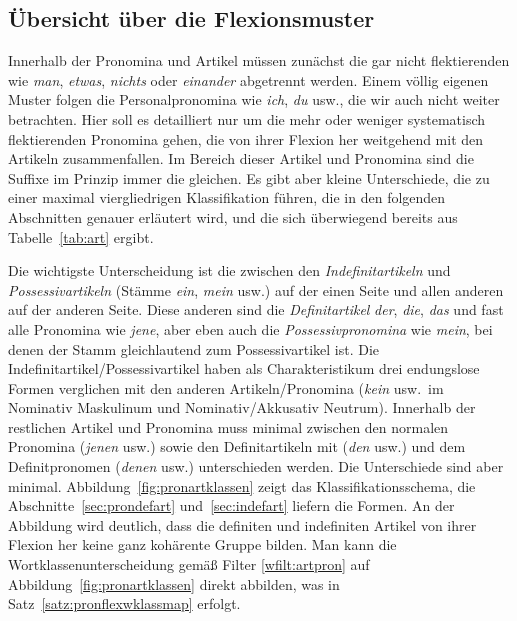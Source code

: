 \subsection{Übersicht über die Flexionsmuster}


Innerhalb der Pronomina und Artikel müssen zunächst die gar nicht flektierenden wie \textit{man}, \textit{etwas}, \textit{nichts} oder \textit{einander} abgetrennt werden.
Einem völlig eigenen Muster folgen die Personalpronomina wie \textit{ich}, \textit{du} usw., die wir auch nicht weiter betrachten.
Hier soll es detailliert nur um die mehr oder weniger systematisch flektierenden Pronomina gehen, die von ihrer Flexion her weitgehend mit den Artikeln zusammenfallen.
Im Bereich dieser Artikel und Pronomina sind die Suffixe im Prinzip immer die gleichen.
Es gibt aber kleine Unterschiede, die zu einer maximal viergliedrigen Klassifikation führen, die in den folgenden Abschnitten genauer erläutert wird, und die sich überwiegend bereits aus Tabelle~\ref{tab:art} ergibt.

Die wichtigste Unterscheidung ist die zwischen den \textit{Indefinitartikeln} und \textit{Possessivartikeln} (Stämme \textit{ein}, \textit{mein} usw.) auf der einen Seite und allen anderen auf der anderen Seite.
Diese anderen sind die \textit{Definitartikel} \textit{der}, \textit{die}, \textit{das} und fast alle Pronomina wie \textit{jene}, aber eben auch die \textit{Possessivpronomina} wie \textit{mein}, bei denen der Stamm gleichlautend zum Possessivartikel ist.
Die Indefinitartikel\slash Possessivartikel haben als Charakteristikum drei endungslose Formen verglichen mit den anderen Artikeln\slash Pronomina (\textit{kein} usw.\ im Nominativ Maskulinum und Nominativ\slash Akkusativ Neutrum).
Innerhalb der restlichen Artikel und Pronomina muss minimal zwischen den normalen Pronomina (\textit{jenen} usw.) sowie den Definitartikeln mit (\textit{den} usw.) und dem Definitpronomen (\textit{denen} usw.) unterschieden werden.
Die Unterschiede sind aber minimal.
Abbildung~\ref{fig:pronartklassen} zeigt das Klassifikationsschema, die Abschnitte~\ref{sec:prondefart} und~\ref{sec:indefart} liefern die Formen.
An der Abbildung wird deutlich, dass die definiten und indefiniten Artikel von ihrer Flexion her keine ganz kohärente Gruppe bilden.
Man kann die Wortklassenunterscheidung gemäß Filter \ref{wfilt:artpron} auf Abbildung~\ref{fig:pronartklassen} direkt abbilden, was in Satz~\ref{satz:pronflexwklassmap} erfolgt.


